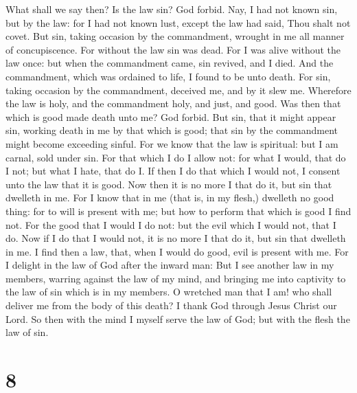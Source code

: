  What shall we say then? Is the law sin? God forbid. Nay,
I had not known sin, but by the law: for I had not known lust, except
the law had said, Thou shalt not covet.  But sin, taking
occasion by the commandment, wrought in me all manner of concupiscence.
For without the law sin was dead.  For I was alive without
the law once: but when the commandment came, sin revived, and I died.
 And the commandment, which was ordained to life, I found
to be unto death.  For sin, taking occasion by the
commandment, deceived me, and by it slew me.  Wherefore
the law is holy, and the commandment holy, and just, and good.
 Was then that which is good made death unto me? God
forbid. But sin, that it might appear sin, working death in me by that
which is good; that sin by the commandment might become exceeding
sinful.  For we know that the law is spiritual: but I am
carnal, sold under sin.  For that which I do I allow not:
for what I would, that do I not; but what I hate, that do I.
 If then I do that which I would not, I consent unto the
law that it is good.  Now then it is no more I that do
it, but sin that dwelleth in me.  For I know that in me
(that is, in my flesh,) dwelleth no good thing: for to will is present
with me; but how to perform that which is good I find not.
 For the good that I would I do not: but the evil which I
would not, that I do.  Now if I do that I would not, it
is no more I that do it, but sin that dwelleth in me.  I
find then a law, that, when I would do good, evil is present with me.
 For I delight in the law of God after the inward man:
 But I see another law in my members, warring against the
law of my mind, and bringing me into captivity to the law of sin which
is in my members.  O wretched man that I am! who shall
deliver me from the body of this death?  I thank God
through Jesus Christ our Lord. So then with the mind I myself serve the
law of God; but with the flesh the law of sin.

\hypertarget{section-7}{%
\section{8}\label{section-7}}

